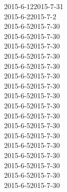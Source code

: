 \documentclass[12pt,a3paper,landscape,oneside]{book}
\begin{document}
			\begin{ganttchart}[	hgrid, 
								vgrid,
								x unit=6mm,
								y unit chart=0.6cm,
								y unit title=0.8cm,
								time slot format=isodate,
							]{2015-6-12}{2015-7-31}
			\\

				{2015-6-2}{2015-7-2} \\
				{2015-6-5}{2015-7-30} \\
				{2015-6-5}{2015-7-30} \\
				{2015-6-5}{2015-7-30} \\
				{2015-6-5}{2015-7-30} \\
				{2015-6-5}{2015-7-30} \\
				{2015-6-5}{2015-7-30} \\
				{2015-6-5}{2015-7-30} \\
				{2015-6-5}{2015-7-30} \\
				{2015-6-5}{2015-7-30} \\
				{2015-6-5}{2015-7-30} \\
				{2015-6-5}{2015-7-30} \\
				{2015-6-5}{2015-7-30} \\
				{2015-6-5}{2015-7-30} \\
				{2015-6-5}{2015-7-30} \\
				{2015-6-5}{2015-7-30} \\
				{2015-6-5}{2015-7-30} \\
				{2015-6-5}{2015-7-30} \\

			\end{ganttchart}
\end{document}
